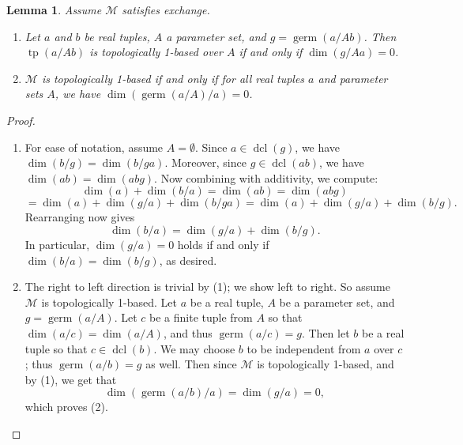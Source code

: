 \documentclass{amsart}
\newtheorem{lemma}[theorem]{Lemma}
\theoremstyle{definition}
\newcommand{\dcl}{\operatorname{dcl}}
\newcommand{\tp}{\operatorname{tp}}
\begin{document}
\begin{lemma}\label{L: 1-based iff dim 0}
    Assume $\mathcal M$ satisfies exchange.
    \begin{enumerate}
        \item Let $a$ and $b$ be real tuples, $A$ a parameter set, and $g=\operatorname{germ}(a/Ab)$. Then $\tp(a/Ab)$ is topologically 1-based over $A$ if and only if $\dim(g/Aa)=0$.
        \item $\mathcal M$ is topologically 1-based if and only if for all real tuples $a$ and parameter sets $A$, we have $\dim(\operatorname{germ}(a/A)/a)=0$.
    \end{enumerate}
\end{lemma}
\begin{proof}
    \begin{enumerate}
        \item For ease of notation, assume $A=\emptyset$. Since $a\in\dcl(g)$, we have $\dim(b/g)=\dim(b/ga)$. Moreover, since $g\in\dcl(ab)$, we have $\dim(ab)=\dim(abg)$. Now combining with additivity, we compute: $$\dim(a)+\dim(b/a)=\dim(ab)=\dim(abg)$$ $$=\dim(a)+\dim(g/a)+\dim(b/ga)=\dim(a)+\dim(g/a)+\dim(b/g).$$ Rearranging now gives $$\dim(b/a)=\dim(g/a)+\dim(b/g).$$ In particular, $\dim(g/a)=0$ holds if and only if $\dim(b/a)=\dim(b/g)$, as desired.
        \item The right to left direction is trivial by (1); we show left to right. So assume $\mathcal M$ is topologically 1-based. Let $a$ be a real tuple, $A$ be a parameter set, and $g=\operatorname{germ}(a/A)$. Let $c$ be a finite tuple from $A$ so that $\dim(a/c)=\dim(a/A)$, and thus $\operatorname{germ}(a/c)=g$. Then let $b$ be a real tuple so that $c\in\dcl(b)$. We may choose $b$ to be independent from $a$ over $c$; thus $\operatorname{germ}(a/b)=g$ as well. Then since $\mathcal M$ is topologically 1-based, and by (1), we get that $$\dim(\operatorname{germ}(a/b)/a)=\dim(g/a)=0,$$ which proves (2).
        \end{enumerate}
\end{proof}

\end{document}
